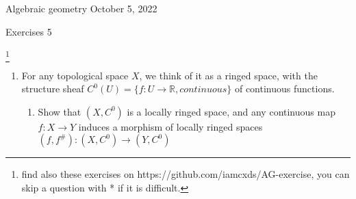 \documentclass[a4paper,11pt]{article}
\def\bb#1{\mathbb{#1}}
\begin{document}
{\small Algebraic geometry \hfill October 5, 2022 \\}
\begin{center}
\Huge Exercises 5
\end{center}

\vskip0.6cm
\footnote{find also these exercises on https://github.com/iamcxds/AG-exercise, you can skip a question with * if it is difficult.}

\begin{enumerate}[1.]

\item For any topological space $ X $, we think of it as a ringed space, with the structure sheaf $C^0(U)=\{f: U\to \bb{R},continuous \}$ of continuous functions.
\begin{enumerate}
    \item Show that $(X, C^0)$ is a locally ringed space, and any continuous map $f: X\to Y$ induces a morphism of locally ringed spaces $ (f,f^\#) : (X,C^0)\to (Y,C^0) $
    

\end{enumerate}
\end{enumerate}
\end{document}

